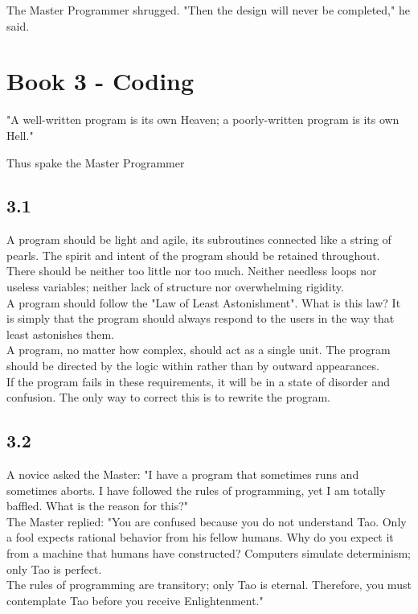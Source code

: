 \documentclass[14pt, letterpaper]{book}
\begin{document}
The Master Programmer shrugged. "Then the design will never be completed," he said.\\

\chapter*{Book 3 - Coding}
\epigraph{"A well-written program is its own Heaven; a poorly-written program is its own Hell."}{Thus spake the Master Programmer}

\section*{3.1}
A program should be light and agile, its subroutines connected like a string of pearls. The spirit and intent of the program should be retained throughout. There should be neither too little nor too much. Neither needless loops nor useless variables; neither lack of structure nor overwhelming rigidity.\\

A program should follow the "Law of Least Astonishment". What is this law? It is simply that the program should always respond to the users in the way that least astonishes them.\\

A program, no matter how complex, should act as a single unit. The program should be directed by the logic within rather than by outward appearances.\\

If the program fails in these requirements, it will be in a state of disorder and confusion. The only way to correct this is to rewrite the program.\\

\section*{3.2}
A novice asked the Master: "I have a program that sometimes runs and sometimes aborts. I have followed the rules of programming, yet I am totally baffled. What is the reason for this?"\\

The Master replied: "You are confused because you do not understand Tao. Only a fool expects rational behavior from his fellow humans. Why do you expect it from a machine that humans have constructed? Computers simulate determinism; only Tao is perfect.\\

The rules of programming are transitory; only Tao is eternal. Therefore, you must contemplate Tao before you receive Enlightenment."\\
\end{document}
